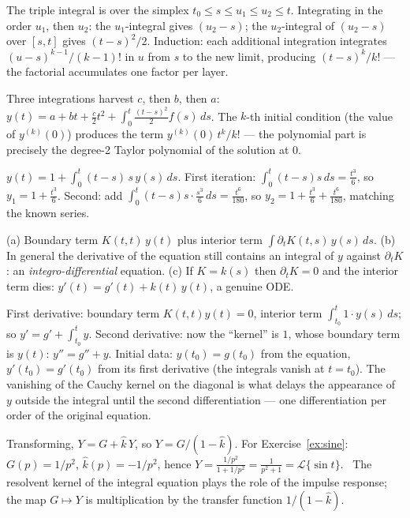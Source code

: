 \documentclass{essay}
\begin{document}
\begin{description}[leftmargin=0pt, itemsep=6pt]
  \item[\ref{ex:cauchy3}.] The triple integral is over the simplex $t_0 \le s \le u_1 \le u_2 \le t$. Integrating in the order $u_1$, then $u_2$: the $u_1$-integral gives $(u_2 - s)$; the $u_2$-integral of $(u_2 - s)$ over $[s, t]$ gives $(t-s)^2/2$. Induction: each additional integration integrates $(u - s)^{k-1}/(k-1)!$ in $u$ from $s$ to the new limit, producing $(t-s)^k/k!$ --- the factorial accumulates one factor per layer.

  \item[\ref{ex:thirdorder}.] Three integrations harvest $c$, then $b$, then $a$:
    $y(t) = a + bt + \tfrac{c}{2}t^2 + \int_0^t \tfrac{(t-s)^2}{2} f(s)\,ds$. The $k$-th initial condition (the value of $y^{(k)}(0)$) produces the term $y^{(k)}(0)\, t^k / k!$ --- the polynomial part is precisely the degree-2 Taylor polynomial of the solution at $0$.

  \item[\ref{ex:airy}.] $y(t) = 1 + \int_0^t (t-s)\,s\,y(s)\,ds$. First iteration: $\int_0^t (t-s)s\,ds = \tfrac{t^3}{6}$, so $y_1 = 1 + \tfrac{t^3}{6}$. Second: add $\int_0^t (t-s)s\cdot\tfrac{s^3}{6}\,ds = \tfrac{t^6}{180}$, so $y_2 = 1 + \tfrac{t^3}{6} + \tfrac{t^6}{180}$, matching the known series.

  \item[\ref{ex:leibniz}.] (a) Boundary term $K(t,t)\,y(t)$ plus interior term $\int \partial_t K(t,s)\,y(s)\,ds$. (b) In general the derivative of the equation still contains an integral of $y$ against $\partial_t K$: an \emph{integro-differential} equation. (c) If $K = k(s)$ then $\partial_t K = 0$ and the interior term dies: $y'(t) = g'(t) + k(t)\,y(t)$, a genuine ODE.

  \item[\ref{ex:twoderivs}.] First derivative: boundary term $K(t,t)y(t) = 0$, interior term $\int_{t_0}^t 1 \cdot y(s)\,ds$; so $y' = g' + \int_{t_0}^t y$. Second derivative: now the ``kernel'' is $1$, whose boundary term is $y(t)$: $y'' = g'' + y$. Initial data: $y(t_0) = g(t_0)$ from the equation, $y'(t_0) = g'(t_0)$ from its first derivative (the integrals vanish at $t = t_0$). The vanishing of the Cauchy kernel on the diagonal is what delays the appearance of $y$ outside the integral until the second differentiation --- one differentiation per order of the original equation.

  \item[\ref{ex:convolution}.] Transforming, $Y = G + \widehat{k}\,Y$, so $Y = G/(1 - \widehat{k})$. For Exercise~\ref{ex:sine}: $G(p) = 1/p^2$, $\widehat{k}(p) = -1/p^2$, hence $Y = \frac{1/p^2}{1 + 1/p^2} = \frac{1}{p^2+1} = \mathcal{L}\{\sin t\}$. \checkmark\ The resolvent kernel of the integral equation plays the role of the impulse response; the map $G \mapsto Y$ is multiplication by the transfer function $1/(1-\widehat{k})$.


\end{description}
\end{document}
